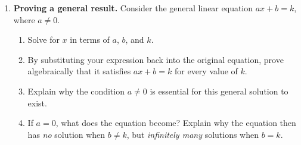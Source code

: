 \documentclass[11pt]{article}
\newcommand{\qspace}{\vspace{1.0cm}}
\begin{document}
\begin{enumerate}
  \item \textbf{Proving a general result.} Consider the general linear equation $ax + b = k$, where $a \neq 0$.
  \begin{enumerate}
    \item Solve for $x$ in terms of $a$, $b$, and $k$.
    \item By substituting your expression back into the original equation, prove algebraically that it satisfies $ax + b = k$ for every value of $k$.
    \item Explain why the condition $a \neq 0$ is essential for this general solution to exist.
    \item If $a = 0$, what does the equation become? Explain why the equation then has \emph{no} solution when $b \neq k$, but \emph{infinitely many} solutions when $b = k$.
  \end{enumerate}
  \qspace
\end{enumerate}
\end{document}
